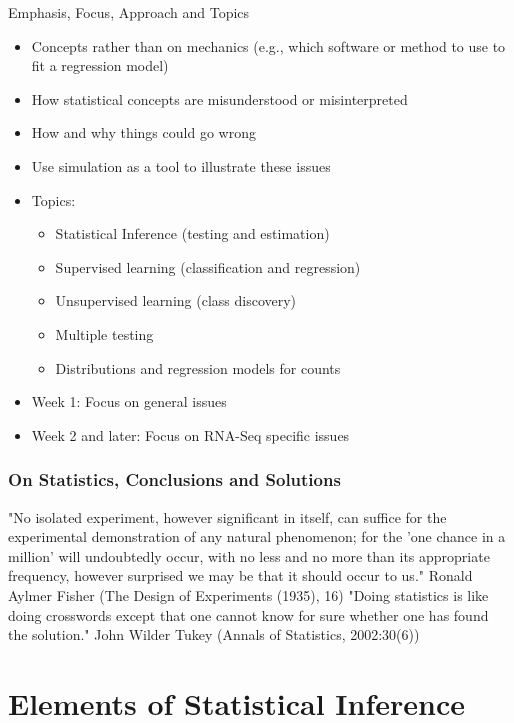 \documentclass[xcolor=x11names,compress]{beamer}\usepackage[]{graphicx}\usepackage[]{color}
\begin{document}
\begin{frame}{Emphasis, Focus, Approach and Topics}
  \begin{itemize}
  \item Concepts rather than on mechanics (e.g., which software or method to use to fit a regression
        model)
  \item How statistical concepts are misunderstood or misinterpreted
  \item How and why things could go wrong
  \item Use simulation as a tool to illustrate these issues 
  \item Topics:
    \begin{itemize}
    \item Statistical Inference (testing and estimation)
    \item Supervised learning (classification and regression)
    \item Unsupervised learning (class discovery)
    \item Multiple testing
    \item Distributions and regression models for counts
    \end{itemize}
  \item Week 1: Focus on general issues
  \item Week 2 and later: Focus on RNA-Seq specific issues
  \end{itemize}
\end{frame}

\begin{frame}
  \frametitle{On Statistics, Conclusions and Solutions}
"No isolated experiment, however significant in itself, can suffice 
for the experimental demonstration of any natural phenomenon; for 
the 'one chance in a million' will undoubtedly occur, with no less 
and no more than its appropriate frequency, however surprised we may 
be that it should occur to us."
\vskip 0.1in
Ronald Aylmer Fisher 
(The Design of Experiments (1935), 16)
\vskip 0.5in
"Doing statistics is like doing crosswords except that one 
cannot know for sure whether
one has found the solution."
\vskip 0.1in
John Wilder Tukey
(Annals of Statistics, 2002:30(6))


\end{frame}



  
\section[Inference]{Elements of Statistical Inference}
\end{document}
